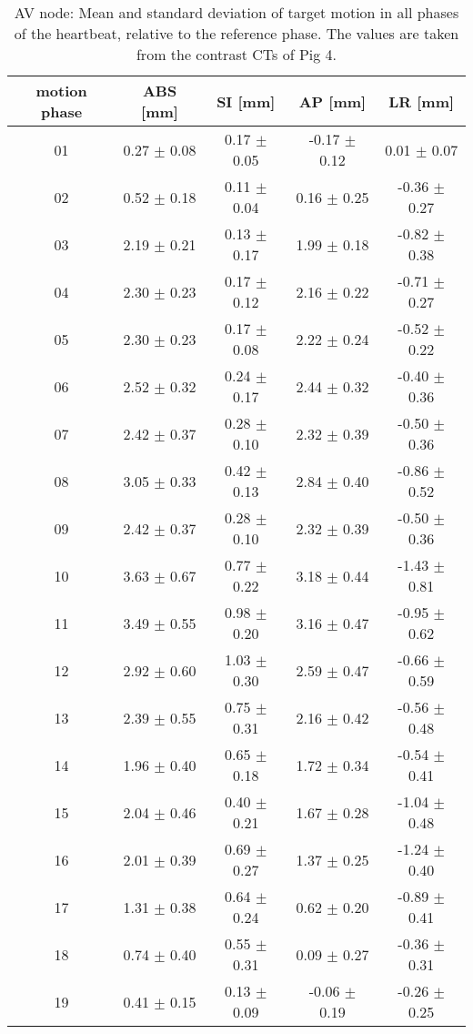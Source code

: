 \begin{table}[H]
  \centering
  \scriptsize
  \caption{AV node: Mean and standard deviation of target motion in all phases of the heartbeat, relative to the reference phase. The values are 
  taken from the contrast CTs of Pig 4.}
  \begin{tabular}{|c|c|c|c|c|}
    \hline\hline
    motion phase\rule{0pt}{2.6ex}\rule[-1.2ex]{0pt}{0pt} & ABS [mm] & SI [mm] & AP [mm] & LR [mm]\\
    \hline
01 &0.27 $\pm$ 0.08 &0.17 $\pm$ 0.05 &-0.17 $\pm$ 0.12 &0.01 $\pm$ 0.07 \\
02 &0.52 $\pm$ 0.18 &0.11 $\pm$ 0.04 &0.16 $\pm$ 0.25 &-0.36 $\pm$ 0.27 \\
03 &2.19 $\pm$ 0.21 &0.13 $\pm$ 0.17 &1.99 $\pm$ 0.18 &-0.82 $\pm$ 0.38 \\
04 &2.30 $\pm$ 0.23 &0.17 $\pm$ 0.12 &2.16 $\pm$ 0.22 &-0.71 $\pm$ 0.27 \\
05 &2.30 $\pm$ 0.23 &0.17 $\pm$ 0.08 &2.22 $\pm$ 0.24 &-0.52 $\pm$ 0.22 \\
06 &2.52 $\pm$ 0.32 &0.24 $\pm$ 0.17 &2.44 $\pm$ 0.32 &-0.40 $\pm$ 0.36 \\
07 &2.42 $\pm$ 0.37 &0.28 $\pm$ 0.10 &2.32 $\pm$ 0.39 &-0.50 $\pm$ 0.36 \\
08 &3.05 $\pm$ 0.33 &0.42 $\pm$ 0.13 &2.84 $\pm$ 0.40 &-0.86 $\pm$ 0.52 \\
09 &2.42 $\pm$ 0.37 &0.28 $\pm$ 0.10 &2.32 $\pm$ 0.39 &-0.50 $\pm$ 0.36 \\
10 &3.63 $\pm$ 0.67 &0.77 $\pm$ 0.22 &3.18 $\pm$ 0.44 &-1.43 $\pm$ 0.81 \\
11 &3.49 $\pm$ 0.55 &0.98 $\pm$ 0.20 &3.16 $\pm$ 0.47 &-0.95 $\pm$ 0.62 \\
12 &2.92 $\pm$ 0.60 &1.03 $\pm$ 0.30 &2.59 $\pm$ 0.47 &-0.66 $\pm$ 0.59 \\
13 &2.39 $\pm$ 0.55 &0.75 $\pm$ 0.31 &2.16 $\pm$ 0.42 &-0.56 $\pm$ 0.48 \\
14 &1.96 $\pm$ 0.40 &0.65 $\pm$ 0.18 &1.72 $\pm$ 0.34 &-0.54 $\pm$ 0.41 \\
15 &2.04 $\pm$ 0.46 &0.40 $\pm$ 0.21 &1.67 $\pm$ 0.28 &-1.04 $\pm$ 0.48 \\
16 &2.01 $\pm$ 0.39 &0.69 $\pm$ 0.27 &1.37 $\pm$ 0.25 &-1.24 $\pm$ 0.40 \\
17 &1.31 $\pm$ 0.38 &0.64 $\pm$ 0.24 &0.62 $\pm$ 0.20 &-0.89 $\pm$ 0.41 \\
18 &0.74 $\pm$ 0.40 &0.55 $\pm$ 0.31 &0.09 $\pm$ 0.27 &-0.36 $\pm$ 0.31 \\
19 &0.41 $\pm$ 0.15 &0.13 $\pm$ 0.09 &-0.06 $\pm$ 0.19 &-0.26 $\pm$ 0.25 \\
    \hline\hline
  \end{tabular}
  \label{tab:motion:AV:Pig4}
\end{table}

